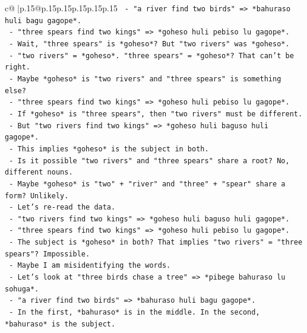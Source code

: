 \documentclass{article}
\begin{document}
{\begin{supertabular}{c@{$\;$}|p{.15\linewidth}@{}p{.15\linewidth}p{.15\linewidth}p{.15\linewidth}p{.15\linewidth}p{.15\linewidth}}
{{{\texttt{                    {-} "a river find two birds" => *bahuraso huli bagu gagope*.} \\
\texttt{                    {-} "three spears find two kings" => *goheso huli pebiso lu gagope*.} \\
\texttt{                      {-} Wait, "three spears" is *goheso*? But "two rivers" was *goheso*.} \\
\texttt{                      {-} "two rivers" = *goheso*. "three spears" = *goheso*? That can't be right.} \\
\texttt{                      {-} Maybe *goheso* is "two rivers" and "three spears" is something else?} \\
\texttt{                      {-} "three spears find two kings" => *goheso huli pebiso lu gagope*.} \\
\texttt{                      {-} If *goheso* is "three spears", then "two rivers" must be different.} \\
\texttt{                      {-} But "two rivers find two kings" => *goheso huli baguso huli gagope*.} \\
\texttt{                      {-} This implies *goheso* is the subject in both.} \\
\texttt{                      {-} Is it possible "two rivers" and "three spears" share a root? No, different nouns.} \\
\texttt{                      {-} Maybe *goheso* is "two" + "river" and "three" + "spear" share a form? Unlikely.} \\
\texttt{                      {-} Let's re{-}read the data.} \\
\texttt{                      {-} "two rivers find two kings" => *goheso huli baguso huli gagope*.} \\
\texttt{                      {-} "three spears find two kings" => *goheso huli pebiso lu gagope*.} \\
\texttt{                      {-} The subject is *goheso* in both? That implies "two rivers" = "three spears"? Impossible.} \\
\texttt{                      {-} Maybe I am misidentifying the words.} \\
\texttt{                      {-} Let's look at "three birds chase a tree" => *pibege bahuraso lu sohuga*.} \\
\texttt{                      {-} "a river find two birds" => *bahuraso huli bagu gagope*.} \\
\texttt{                      {-} In the first, *bahuraso* is in the middle. In the second, *bahuraso* is the subject.} \\
}}}
\end{supertabular}}
\end{document}
